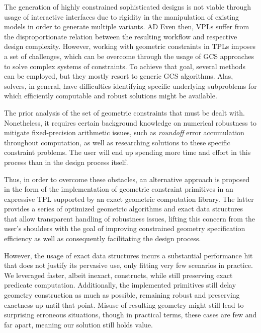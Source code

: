 %
\label{chap:conclusion}
\cleardoublepage{}

\noindent The generation of highly constrained sophisticated designs is not
viable through usage of interactive interfaces due to rigidity in the
manipulation of existing models in order to generate multiple variants.  
\Ac{AD} Even
then, \Acp{VPL} suffer from the disproportionate relation between the resulting
workflow and respective design complexity.  However, working with geometric
constraints in \acp{TPL} imposes a set of challenges, which can be overcome
through the usage of \ac{GCS} approaches to solve complex systems of
constraints.  To achieve that goal, several methods can be employed, but they
mostly resort to generic \acs{GCS} algorithms.  Alas, solvers, in general, have
difficulties identifying specific underlying subproblems for which efficiently
computable and robust solutions might be available.

The prior analysis of the set of geometric constraints that must be dealt with.
Nonetheless, it requires certain background knowledge on numerical robustness to
mitigate fixed-precision arithmetic issues, such as \textit{roundoff} error
accumulation throughout computation, as well as researching solutions to these
specific constraint problems.  The user will end up spending more time and
effort in this process than in the design process itself.

Thus, in order to overcome these obstacles, an alternative approach is proposed
in the form of the implementation of geometric constraint primitives in an
expressive \ac{TPL} supported by an exact geometric computation library.  The
latter provides a series of optimized geometric algorithms and exact data
structures that allow transparent handling of robustness issues, lifting this
concern from the user's shoulders with the goal of improving constrained
geometry specification efficiency as well as consequently facilitating the
design process.

However, the usage of exact data structures incurs a substantial performance hit
that does not justify its pervasive use, only fitting very few scenarios in
practice.  We leveraged faster, albeit inexact, constructs, while still
preserving exact predicate computation.  Additionally, the implemented
primitives still delay geometry construction as much as possible, remaining
robust and preserving exactness up until that point.  Misuse of resulting
geometry might still lead to surprising erroneous situations, though in
practical terms, these cases are few and far apart, meaning our solution still
holds value.

